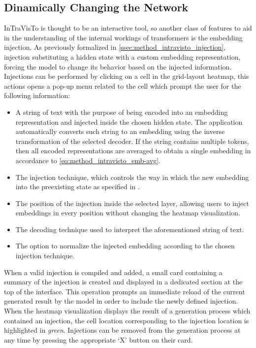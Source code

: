 
\subsection{Dinamically Changing the Network}\label{sec:exp_intravisto_exp3}


InTraVisTo is thought to be an interactive tool, so another class of features to aid in the understanding of the internal workings of transformers is the embedding injection.
As previously formalized in \cref{ssec:method_intravisto_injection}, injection  substituting a hidden state with a custom embedding representation, forcing the model to change its behavior based on the injected information.
Injections can be performed by clicking on a cell in the grid-layout heatmap, this actions opens a pop-up menu related to the cell which prompt the user for the following information:
\begin{itemize}
    \item A string of text with the purpose of being encoded into an embedding representation and injected inside the chosen hidden state.
The application automatically converts such string to an embedding using the inverse transformation of the selected decoder.
If the string contains multiple tokens, then all encoded representations are averaged to obtain a single embedding in accordance to \cref{eq:method_intravisto_emb-avg}.
    \item The injection technique, which controls the way in which the new embedding  into the preexisting state as specified in .
    \item The position of the injection inside the selected layer, allowing users to inject embeddings in every position without changing the heatmap visualization.
    \item The decoding technique used to interpret the aforementioned string of text.
    \item The option to normalize the injected embedding according to the chosen injection technique. 
\end{itemize}


When a valid injection is compiled and added, a small card containing a summary of the injection is created and displayed in a dedicated section at the top of the interface.
This operation prompts an immediate reload of the current generated result by the model in order to include the newly defined injection.
When the heatmap visualization displays the result of a generation process which contained an injection, the cell location corresponding to the injection location is highlighted in \emph{green}.
Injections can be removed from the generation process at any time by pressing the appropriate `X' button on their card.

